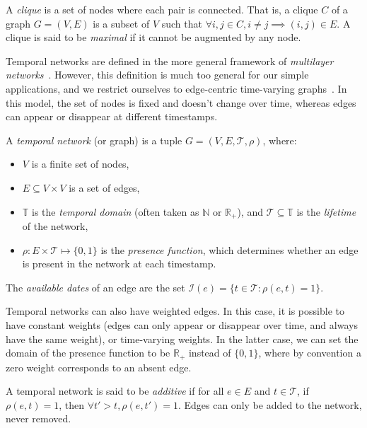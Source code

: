 \documentclass[a4paper,11pt,openany,extrafontsizes]{memoir}
\begin{document}
\begin{defn}[Clique]
  A \emph{clique} is a set of nodes where each pair is connected. That
  is, a clique $C$ of a graph $G = (V,E)$ is a subset of $V$ such that
  $\forall i,j\in C, i \neq j \implies (i,j)\in E$. A clique is said
  to be \emph{maximal} if it cannot be augmented by any node.
\end{defn}

Temporal networks are defined in the more general framework of
\emph{multilayer networks}~\cite{kivela_multilayer_2014}. However,
this definition is much too general for our simple applications, and
we restrict ourselves to edge-centric time-varying
graphs~\cite{casteigts_time-varying_2012}. In this model, the set of
nodes is fixed and doesn't change over time, whereas edges can appear
or disappear at different timestamps.

\begin{defn}
  A \emph{temporal network} (or graph) is a tuple
  $G = (V, E, \mathcal{T}, \rho)$, where:
  \begin{itemize}
  \item $V$ is a finite set of nodes,
  \item $E\subseteq V\times V$ is a set of edges,
  \item $\mathbb{T}$ is the \emph{temporal domain} (often taken as
    $\mathbb{N}$ or $\mathbb{R}_+$), and
    $\mathcal{T}\subseteq\mathbb{T}$ is the \emph{lifetime} of the
    network,
  \item $\rho: E\times\mathcal{T}\mapsto\{0,1\}$ is the \emph{presence
      function}, which determines whether an edge is present in the
    network at each timestamp.
  \end{itemize}
  The \emph{available dates} of an edge are the set
  $\mathcal{I}(e) = \{t\in\mathcal{T}: \rho(e,t)=1\}$.
\end{defn}

Temporal networks can also have weighted edges. In this case, it is
possible to have constant weights (edges can only appear or disappear
over time, and always have the same weight), or time-varying
weights. In the latter case, we can set the domain of the presence
function to be $\mathbb{R}_+$ instead of $\{0,1\}$, where by
convention a zero weight corresponds to an absent edge.

\begin{defn}
  A temporal network is said to be \emph{additive} if for all $e\in E$
  and $t\in\mathcal{T}$, if $\rho(e,t)=1$, then
  $\forall t'>t, \rho(e, t') = 1$. Edges can only be added to the
  network, never removed.
\end{defn}
\end{document}
